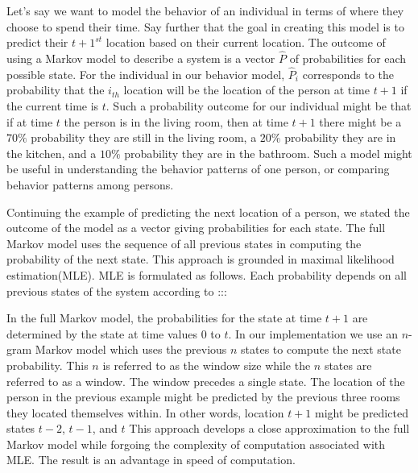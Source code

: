 Let's say we want to model the behavior
of an individual in terms of where 
they choose to spend their time.
Say further that the goal in creating
this model is to predict their $t+1^{st}$ location
based on their current location.
%
The outcome of using a Markov model to describe a system
is a vector $\hat{P}$ of probabilities for each possible state.
For the individual in our behavior model,
$\hat{P}_i$ corresponds to the probability that the $i_{th}$ location
will be the location of the person at time $t+1$ if the current time is $t$.
%
Such a probability outcome for our individual might be
that if at time $t$ the person is in the living room,
then at time $t+1$ there might be 
a $70\%$ probability they are still in the living room,
a $20\%$ probability they are in the kitchen, and
a $10\%$ probability they are in the bathroom.
%
Such a model might be useful in understanding 
the behavior patterns of one person, or
comparing behavior patterns among persons.

Continuing the example of predicting
the next location of a person,
we stated the outcome of the model as a vector
giving probabilities for each state.
The full Markov model uses the sequence of all previous states
in computing the probability of the next state.
%
%
This approach is grounded in
maximal likelihood estimation(MLE).
MLE is formulated as follows.
Each probability depends on all previous states of the system
according to :::%

In the full Markov model,
the probabilities for the state at time $t+1$
are determined by the state at time values $0$ to $t$.
In our implementation we use an
$n$-gram Markov model which uses the
previous $n$ states to compute the
next state probability.
This $n$ is referred to as the window size
while the $n$ states are
referred to as a window.
The window precedes a single state.
%
The location of the person in the
previous example might be predicted by
the previous three rooms they located
themselves within.
In other words,
location $t+1$ might be predicted
states $t-2$, $t-1$, and $t$
%
This approach develops a close approximation
to the full Markov model while
forgoing the complexity of computation
associated with MLE.
The result is an advantage in 
speed of computation.

